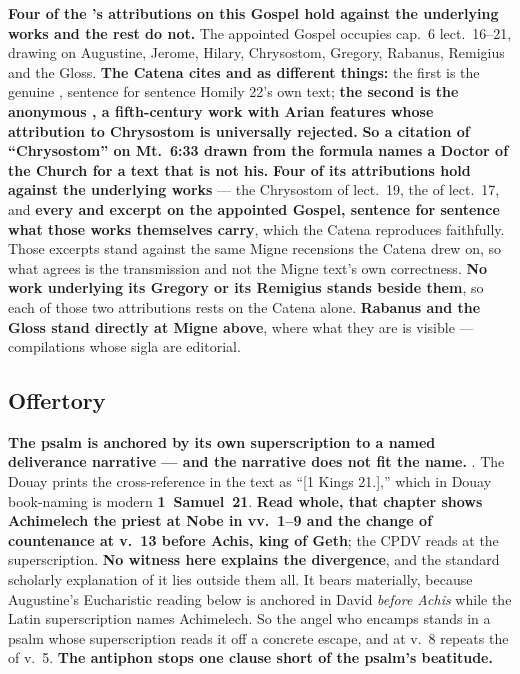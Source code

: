 \textbf{Four of the 's attributions on this Gospel hold
against the underlying works and the rest do not.} The appointed Gospel occupies
cap.~6 lect.~16--21, drawing on Augustine, Jerome, Hilary, Chrysostom, Gregory,
Rabanus, Remigius and the Gloss. \textbf{The Catena cites  and  as different things:} the
first is the genuine , sentence for
sentence Homily 22's own text; \textbf{the second is
the anonymous , a fifth-century work with
Arian features whose attribution to Chrysostom is universally rejected.}
\textbf{So a citation of ``Chrysostom'' on Mt.\ 6:33 drawn from the
 formula names a Doctor of the Church for a text that is not
his.}
\textbf{Four of its attributions hold against the underlying works} --- the
Chrysostom of lect.~19, the  of lect.~17, and
\textbf{every  and  excerpt on the appointed
Gospel, sentence for sentence what those works themselves carry}, which the
Catena reproduces faithfully. Those excerpts stand against the same
Migne recensions the Catena drew on, so what agrees is the transmission and not
the Migne text's own correctness. \textbf{No work underlying its Gregory or its Remigius stands beside them}, so
each of those two attributions rests on the Catena alone. \textbf{Rabanus and the Gloss stand
directly at Migne above}, where what they are is visible --- compilations whose
sigla are editorial.

\elementguard
\subsection*{Offertory }


\textbf{The psalm is anchored by its own superscription to a named deliverance
narrative --- and the narrative does not fit the name.} . The Douay prints the
cross-reference in the text as ``[1 Kings 21.],'' which in Douay book-naming is
modern \textbf{1~Samuel~21}. \textbf{Read whole, that chapter shows Achimelech
the priest at Nobe in vv.~1--9 and the change of countenance at v.~13 before
Achis, king of Geth}; the CPDV reads  at the
superscription. \textbf{No witness here explains the divergence}, and the standard scholarly
explanation of it lies outside them all. It bears materially, because Augustine's
Eucharistic reading below is anchored in David \emph{before Achis} while the
Latin superscription names Achimelech. So the angel who encamps stands in a
psalm whose superscription reads it off a concrete escape, and  at v.~8 repeats the  of v.~5. \textbf{The antiphon stops
one clause short of the psalm's beatitude.}

